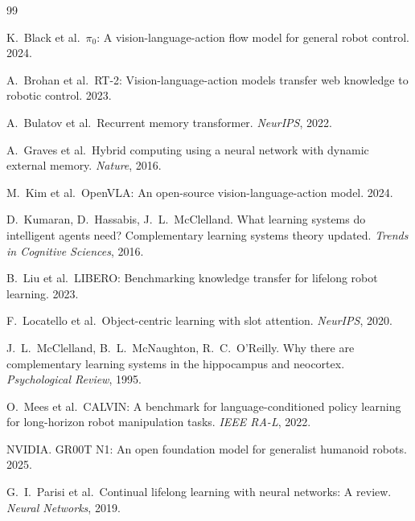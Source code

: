 \documentclass[10pt,letterpaper]{article}
\begin{document}
\small

\begin{thebibliography}{99}

K.~Black et al.\ \newblock $\pi_0$: A vision-language-action flow model for general robot control. 2024.

A.~Brohan et al.\ \newblock RT-2: Vision-language-action models transfer web knowledge to robotic control. 2023.

A.~Bulatov et al.\ \newblock Recurrent memory transformer. \emph{NeurIPS}, 2022.

A.~Graves et al.\ \newblock Hybrid computing using a neural network with dynamic external memory. \emph{Nature}, 2016.

M.~Kim et al.\ \newblock OpenVLA: An open-source vision-language-action model. 2024.

D.~Kumaran, D.~Hassabis, J.~L.~McClelland. \newblock What learning systems do intelligent agents need? Complementary learning systems theory updated. \emph{Trends in Cognitive Sciences}, 2016.

B.~Liu et al.\ \newblock LIBERO: Benchmarking knowledge transfer for lifelong robot learning. 2023.

F.~Locatello et al.\ \newblock Object-centric learning with slot attention. \emph{NeurIPS}, 2020.

J.~L.~McClelland, B.~L.~McNaughton, R.~C.~O'Reilly. \newblock Why there are complementary learning systems in the hippocampus and neocortex. \emph{Psychological Review}, 1995.

O.~Mees et al.\ \newblock CALVIN: A benchmark for language-conditioned policy learning for long-horizon robot manipulation tasks. \emph{IEEE RA-L}, 2022.

NVIDIA. \newblock GR00T N1: An open foundation model for generalist humanoid robots. 2025.

G.~I.~Parisi et al.\ \newblock Continual lifelong learning with neural networks: A review. \emph{Neural Networks}, 2019.


\end{thebibliography}
\end{document}
